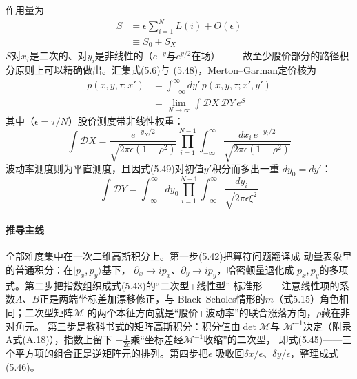 作用量为
\begin{align*}
S&=\epsilon\sum_{i=1}^{N}L(i)+O(\epsilon)\\
&\equiv S_{0}+S_{X}
\tag{5.48}
\end{align*}
$S$对$x_{i}$是二次的、对$y_{i}$是非线性的（$e^{-y}$与$e^{y/2}$在场）
——故至少股价部分的路径积分原则上可以精确做出。汇集式(5.6)与
(5.48)，Merton--Garman定价核为
\begin{align*}
p(x,y,\tau;x')&=\int_{-\infty}^{\infty}dy'\,p(x,y,\tau;x',y')\\
&=\lim_{N\to\infty}\int\mathcal{D}X\,\mathcal{D}Y\,e^{S}
\tag{5.49}
\end{align*}
其中（$\epsilon=\tau/N$）股价测度带非线性权重：
\begin{equation*}
\int\mathcal{D}X=\frac{e^{-y_{N}/2}}{\sqrt{2\pi\epsilon(1-\rho^{2})}}
\prod_{i=1}^{N-1}\int_{-\infty}^{\infty}
\frac{dx_{i}\,e^{-y_{i}/2}}{\sqrt{2\pi\epsilon(1-\rho^{2})}}
\tag{5.50}
\end{equation*}
波动率测度则为平直测度，且因式(5.49)对初值$y'$积分而多出一重
$dy_{0}=dy'$：
\begin{equation*}
\int\mathcal{D}Y=\int_{-\infty}^{\infty}dy_{0}
\prod_{i=1}^{N-1}\int_{-\infty}^{\infty}
\frac{dy_{i}}{\sqrt{2\pi\epsilon\xi^{2}}}
\tag{5.51}
\end{equation*}

\paragraph{推导主线}
全部难度集中在一次二维高斯积分上。第一步(5.42)把算符问题翻译成
动量表象里的普通积分：在$\vert p_{x},p_{y}\rangle$基下，
$\partial_{x}\to ip_{x}$、$\partial_{y}\to ip_{y}$，哈密顿量退化成
$p_{x},p_{y}$的多项式。第二步把指数组织成式(5.43)的“二次型+线性型”
标准形——注意线性项的系数$A$、$B$正是两端坐标差加漂移修正，与
Black--Scholes情形的$m$（式5.15）角色相同；二次型矩阵$\mathcal{M}$
的两个本征方向就是“股价+波动率”的联合涨落方向，$\rho$藏在非对角元。
第三步是教科书式的矩阵高斯积分：积分值由$\det\mathcal{M}$与
$\mathcal{M}^{-1}$决定（附录A式(A.18)），指数上留下
$-\frac{1}{2\epsilon}$乘“坐标差经$\mathcal{M}^{-1}$收缩”的二次型，
即式(5.45)——三个平方项的组合正是逆矩阵元的排列。第四步把$\epsilon$
吸收回$\delta x/\epsilon$、$\delta y/\epsilon$，整理成式(5.46)。

